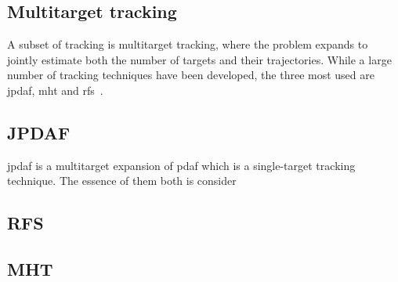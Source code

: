 \subsection{Multitarget tracking}
A subset of tracking is multitarget tracking, where the problem expands to jointly estimate both the number of targets and their trajectories. While a large number of tracking techniques have been developed, the three most used are \gls{jpdaf}, \gls{mht} and \gls{rfs}~\cite{Vo2015}.

\subsection{JPDAF}
\gls{jpdaf} is a multitarget expansion of \gls{pdaf} which is a single-target tracking technique. The essence of them both is consider 

\subsection{RFS}

\subsection{MHT}